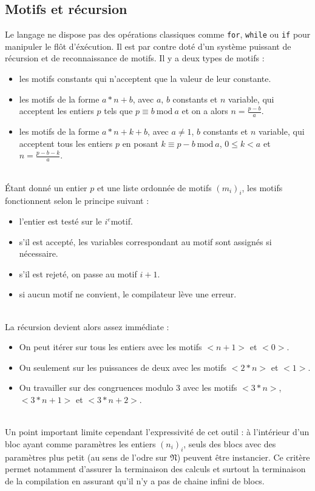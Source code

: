 \documentclass[13pt]{article}
\begin{document}
\subsection{Motifs et récursion}
Le langage ne dispose pas des opérations classiques comme \texttt{for},
\texttt{while} ou \texttt{if} pour manipuler le flôt d'éxécution. Il est par
contre doté d'un système puissant de récursion et de reconnaissance de motifs.
Il y a deux types de motifs :
\begin{itemize}
\item les motifs constants qui n'acceptent que la valeur de leur constante. 
\item les motifs de la forme $ a*n + b $, avec $a$, $b$ constants et $n$
  variable, qui acceptent les entiers $p$  tels que $p \equiv b\
  \text{mod}\ a$ et on a alors $n = \frac{p - b}{a}$.
\item les motifs de la forme $ a*n + k + b $, avec $a \neq 1 $, $b$ constants et
  $n$ variable, qui acceptent tous les entiers $p$ en posant $k \equiv  p - b\
  \text{mod}\ a$, $0 \leq k < a$ et $n = \frac{p - b - k}{a}$.
\end{itemize}
\text{}\\
Étant donné un entier $p$ et une liste ordonnée de motifs $(m_i)_i$, les motifs
fonctionnent selon le principe suivant : 
\begin{itemize}
\item l'entier est testé sur le $i^{e}$motif.
\item s'il est accepté, les variables correspondant au motif sont assignés si
  nécessaire.
\item s'il est rejeté, on passe au motif $i+1$.
\item si aucun motif ne convient, le compilateur lève une erreur.
\end{itemize}
\text{}\\
La récursion devient alors assez immédiate :
\begin{itemize}
\item On peut itérer sur tous les entiers avec les motifs $<n+1>$ et $<0>$.
\item Ou seulement sur les puissances de deux avec les motifs $<2*n>$ et $<1>$.
\item Ou travailler sur des congruences modulo 3 avec les motifs $<3*n>$, $<3*n +
  1>$ et $<3*n + 2>$.
\end{itemize}
\text{}\\
Un point important limite cependant l'expressivité de cet outil : à l'intérieur
d'un bloc ayant comme paramètres les entiers $(n_i)_i$, seuls des blocs avec
des paramètres plus petit (au sens de l'odre sur $\mathfrak{N}$) peuvent être
instancier. Ce critère permet notamment d'assurer la terminaison des calculs et
surtout la terminaison de la compilation en assurant qu'il n'y a pas de chaine
infini de blocs.
\end{document}
